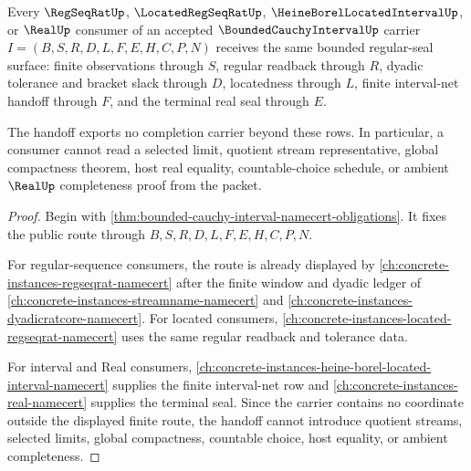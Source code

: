 \begin{theorem}
\label{thm:bounded-cauchy-interval-regular-seal-handoff}
Every $\RegSeqRatUp$, $\LocatedRegSeqRatUp$, $\HeineBorelLocatedIntervalUp$, or $\RealUp$ consumer of an accepted $\BoundedCauchyIntervalUp$ carrier $I=(B,S,R,D,L,F,E,H,C,P,N)$ receives the same bounded regular-seal surface: finite observations through $S$, regular readback through $R$, dyadic tolerance and bracket slack through $D$, locatedness through $L$, finite interval-net handoff through $F$, and the terminal real seal through $E$.

The handoff exports no completion carrier beyond these rows. In particular, a consumer cannot read a selected limit, quotient stream representative, global compactness theorem, host real equality, countable-choice schedule, or ambient $\RealUp$ completeness proof from the packet.
\end{theorem}
\begin{proof}
Begin with \autoref{thm:bounded-cauchy-interval-namecert-obligations}. It fixes the public route through $B,S,R,D,L,F,E,H,C,P,N$.

For regular-sequence consumers, the route is already displayed by \autoref{ch:concrete-instances-regseqrat-namecert} after the finite window and dyadic ledger of \autoref{ch:concrete-instances-streamname-namecert} and \autoref{ch:concrete-instances-dyadicratcore-namecert}. For located consumers, \autoref{ch:concrete-instances-located-regseqrat-namecert} uses the same regular readback and tolerance data.

For interval and Real consumers, \autoref{ch:concrete-instances-heine-borel-located-interval-namecert} supplies the finite interval-net row and \autoref{ch:concrete-instances-real-namecert} supplies the terminal seal. Since the carrier contains no coordinate outside the displayed finite route, the handoff cannot introduce quotient streams, selected limits, global compactness, countable choice, host equality, or ambient completeness.
\end{proof}


